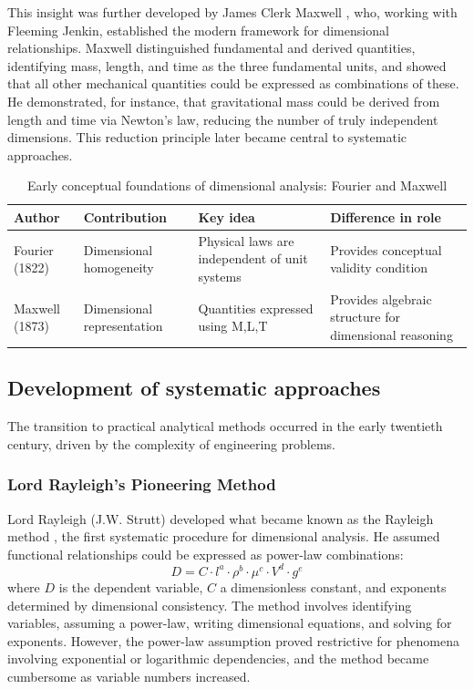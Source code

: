 This insight was further developed by James Clerk Maxwell \cite{maxwell1873}, who, working with Fleeming Jenkin, established the modern framework for dimensional relationships. Maxwell distinguished fundamental and derived quantities, identifying mass, length, and time as the three fundamental units, and showed that all other mechanical quantities could be expressed as combinations of these. He demonstrated, for instance, that gravitational mass could be derived from length and time via Newton's law, reducing the number of truly independent dimensions. This reduction principle later became central to systematic approaches.

\begin{table}[h]
\centering
\small
\begin{tabular}{p{2.2cm} p{3.6cm} p{4cm} p{3.5cm}}
\hline
Author & Contribution & Key idea & Difference in role \\
\hline
Fourier (1822) & Dimensional homogeneity & Physical laws are independent of unit systems & Provides conceptual validity condition \\
Maxwell (1873) & Dimensional representation & Quantities expressed using M,L,T & Provides algebraic structure for dimensional reasoning \\
\hline
\end{tabular}
\caption{Early conceptual foundations of dimensional analysis: Fourier and Maxwell}
\label{tab:comparison_dimensional_analysis}
\end{table}

\subsection{Development of systematic approaches}

The transition to practical analytical methods occurred in the early twentieth century, driven by the complexity of engineering problems.

\subsubsection*{Lord Rayleigh's Pioneering Method}

Lord Rayleigh (J.W. Strutt) developed what became known as the Rayleigh method \cite{rayleigh1915}, the first systematic procedure for dimensional analysis. He assumed functional relationships could be expressed as power-law combinations:
\begin{equation}
D = C \cdot l^a \cdot \rho^b \cdot \mu^c \cdot V^d \cdot g^e
\end{equation}
where $D$ is the dependent variable, $C$ a dimensionless constant, and exponents determined by dimensional consistency. The method involves identifying variables, assuming a power-law, writing dimensional equations, and solving for exponents. However, the power-law assumption proved restrictive for phenomena involving exponential or logarithmic dependencies, and the method became cumbersome as variable numbers increased.

